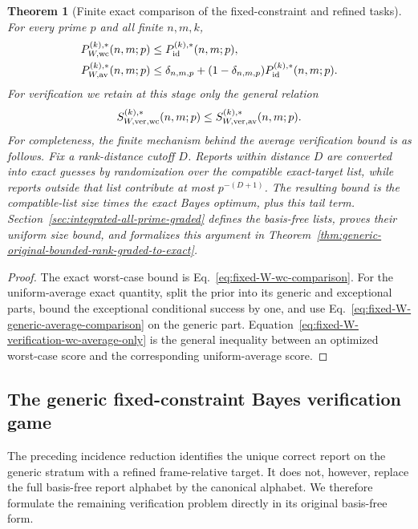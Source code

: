\documentclass[11pt]{article}
\newcommand{\1}{\mathbf 1}
\theoremstyle{plain}
\newtheorem{theorem}{Theorem}[section]
\theoremstyle{definition}
\theoremstyle{remark}
\begin{document}
\begin{theorem}[Finite exact comparison of the fixed-constraint and refined tasks]
\label{thm:fixed-W-operational-comparison}
For every prime $p$ and all finite $n,m,k$,
\begin{align}
 P_{W,\rm wc}^{(k),*}(n,m;p)&\le P_{\mathrm{id}}^{(k),*}(n,m;p),
 \label{eq:fixed-W-wc-final-comparison}\\
 P_{W,\rm av}^{(k),*}(n,m;p)
 &\le\delta_{n,m,p}+(1-\delta_{n,m,p})P_{\mathrm{id}}^{(k),*}(n,m;p).
 \label{eq:fixed-W-av-comparison}
\end{align}
For verification we retain at this stage only the general relation
\begin{equation}
 S_{W,\rm ver,wc}^{(k),*}(n,m;p)
 \le S_{W,\rm ver,av}^{(k),*}(n,m;p).
 \label{eq:fixed-W-verification-wc-average-only}
\end{equation}
For completeness, the finite mechanism behind the average verification
bound is as follows.  Fix a rank-distance cutoff $D$.  Reports within distance
$D$ are converted into exact guesses by randomization over the compatible
exact-target list, while reports outside that list contribute at most
$p^{-(D+1)}$.  The resulting bound is the compatible-list size times the
exact Bayes optimum, plus this tail term.  Section~\ref{sec:integrated-all-prime-graded}
defines the basis-free lists, proves their uniform size bound, and formalizes
this argument in
Theorem~\ref{thm:generic-original-bounded-rank-graded-to-exact}.
\end{theorem}
\begin{proof}
The exact worst-case bound is Eq.~\eqref{eq:fixed-W-wc-comparison}.  For the
uniform-average exact quantity, split the prior into its generic and
exceptional parts, bound the exceptional conditional success by one, and use
Eq.~\eqref{eq:fixed-W-generic-average-comparison} on the generic part.
Equation~\eqref{eq:fixed-W-verification-wc-average-only} is the general
inequality between an optimized worst-case score and the corresponding
uniform-average score.
\end{proof}


\subsection{The generic fixed-constraint Bayes verification game}
\label{subsec:generic-fixed-W-Bayes-verification-game}
The preceding incidence reduction identifies the unique correct report on the
generic stratum with a refined frame-relative target.  It does not, however,
replace the full basis-free report alphabet by the canonical alphabet.  We
therefore formulate the remaining verification problem directly in its
original basis-free form.
\end{document}

